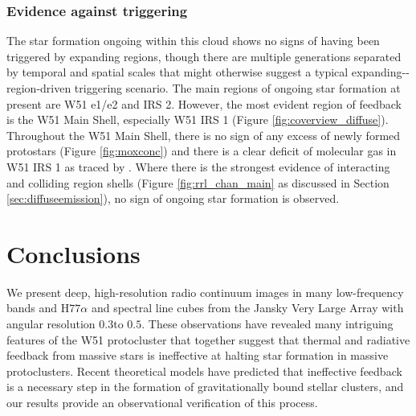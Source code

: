 \subsubsection{Evidence against triggering}
The star formation ongoing within this cloud shows no signs of having been
triggered by expanding \hii regions, though there are multiple generations
separated by temporal and spatial scales that might otherwise suggest a typical
expanding-\hii-region-driven triggering
scenario.  The main regions of ongoing star formation at present are W51 e1/e2
and IRS 2.  However, the most evident region of feedback is the W51 Main Shell,
especially W51 IRS 1 
(Figure \ref{fig:coverview_diffuse}).  Throughout the W51 Main Shell, there is no sign
of any excess of newly formed protostars (Figure \ref{fig:moxconc}) and there
is a clear deficit of molecular gas in W51 IRS 1 as traced by \ceighteeno \citep[Figure
\ref{fig:contonco};][]{Parsons2012a}.  Where there is the
strongest evidence of interacting and colliding \hii region shells (Figure
\ref{fig:rrl_chan_main} as discussed in Section \ref{sec:diffuseemission}),
no sign of ongoing star formation is observed.


\section{Conclusions}
\label{sec:conclusion}
We present deep, high-resolution radio continuum images in many low-frequency
bands and H$77\alpha$ and \ortho \twotwo spectral line cubes  from the Jansky
Very Large Array with angular resolution $0.3$\arcsec to $0.5$\arcsec.   These
observations have revealed many intriguing features of the W51 protocluster
that together suggest that thermal and radiative feedback from massive stars is
ineffective at halting star formation in massive protoclusters.
Recent theoretical models have predicted that ineffective feedback is a
necessary step in the formation of gravitationally bound stellar clusters, and
our results provide an observational verification of this process.

